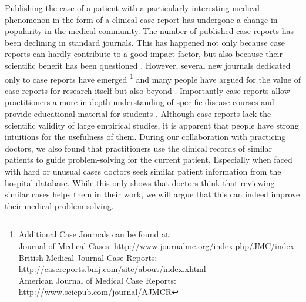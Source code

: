 Publishing the case of a patient with a particularly interesting medical phenomenon in the form of a clinical case report has undergone a change in popularity in the medical community.
The number of published case reports has been declining in standard journals. This has happened not only because case reports can hardly contribute to a good impact factor, but also because their scientific benefit has been questioned \citep{Mason2001}. However, several new journals dedicated only to case reports have emerged \citep{Kidd2007}\footnote{Additional Case Journals can be found at:\\Journal of Medical Cases: http://www.journalmc.org/index.php/JMC/index\\British Medical Journal Case Reports: http://casereports.bmj.com/site/about/index.xhtml\\American Journal of Medical Case Reports: http://www.sciepub.com/journal/AJMCR} and many people have argued for the value of case reports for research itself but also beyond \citep{Williams2003,Dib2008,Sandu2016}. Importantly case reports allow practitioners a more in-depth understanding of specific disease courses and provide educational material for students \citep{Nissen2014}. Although case reports lack the scientific validity of large empirical studies, it is apparent that people have strong intuitions for the usefulness of them. During our collaboration with practicing doctors, we also found that practitioners use the clinical records of similar patients to guide problem-solving for the current patient. Especially when faced with hard or unusual cases doctors seek similar patient information from the hospital database. While this only shows that doctors think that reviewing similar cases helps them in their work, we will argue that this can indeed improve their medical problem-solving. 

